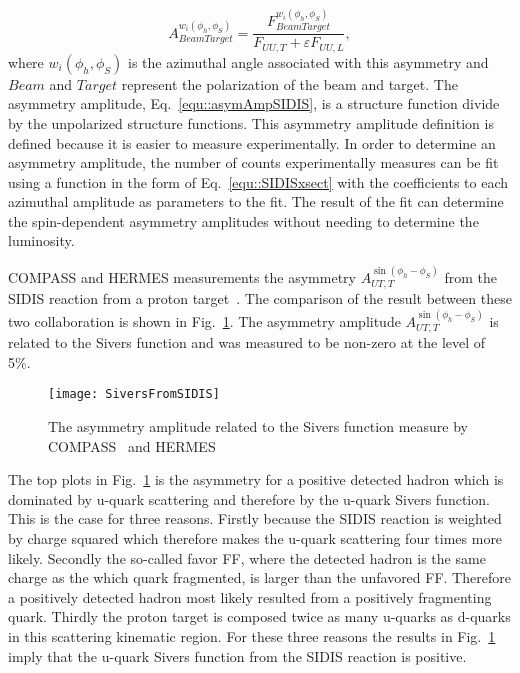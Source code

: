 \begin{equation}
  A^{w_i(\phi_h, \phi_S)}_{BeamTarget} = \frac{F^{w_i(\phi_h,
      \phi_S)}_{BeamTarget}}{F_{UU,T}+\varepsilon F_{UU,L}},
  \label{equ::asymAmpSIDIS}
\end{equation}
\noindent
where $w_i(\phi_h, \phi_S)$ is the azimuthal angle associated with this
asymmetry and $Beam$ and $Target$ represent the polarization of the beam and
target.  The asymmetry amplitude, Eq.~\ref{equ::asymAmpSIDIS}, is a structure
function divide by the unpolarized structure functions.  This asymmetry
amplitude definition is defined because it is easier to measure experimentally.
In order to determine an asymmetry amplitude, the number of counts
experimentally measures can be fit using a function in the form of
Eq.~\ref{equ::SIDISxsect} with the coefficients to each azimuthal amplitude as
parameters to the fit.  The result of the fit can determine the spin-dependent
asymmetry amplitudes without needing to determine the luminosity.

COMPASS and HERMES measurements the asymmetry $A_{UT ,T}^{\sin\left(\phi_h
  -\phi_S\right)}$ from the SIDIS reaction from a proton
target~\cite{Alekseev:2008aa,Airapetian:2009ae}.  The comparison of the result
between these two collaboration is shown in Fig.~\ref{fig::SiversFromSIDIS}.
The asymmetry amplitude $A_{UT ,T}^{\sin\left(\phi_h-\phi_S\right)}$ is related
to the Sivers function and was measured to be non-zero at the level of 5\%.

\begin{figure}[h!t]
  \centering \texttt{[image: SiversFromSIDIS]}
  \caption{The asymmetry amplitude related to the Sivers function measure by
    COMPASS~\cite{Alekseev:2008aa} and HERMES~\cite{Airapetian:2009ae}}
  \label{fig::SiversFromSIDIS}
\end{figure}

The top plots in Fig.~\ref{fig::SiversFromSIDIS} is the asymmetry for a positive
detected hadron which is dominated by u-quark scattering and therefore by the
u-quark Sivers function.  This is the case for three reasons.  Firstly because
the SIDIS reaction is weighted by charge squared which therefore makes the
u-quark scattering four times more likely.  Secondly the so-called favor FF,
where the detected hadron is the same charge as the which quark fragmented, is
larger than the unfavored FF.  Therefore a positively detected hadron most
likely resulted from a positively fragmenting quark.  Thirdly the proton target
is composed twice as many u-quarks as d-quarks in this scattering kinematic
region.  For these three reasons the results in Fig.~\ref{fig::SiversFromSIDIS}
imply that the u-quark Sivers function from the SIDIS reaction is positive.

